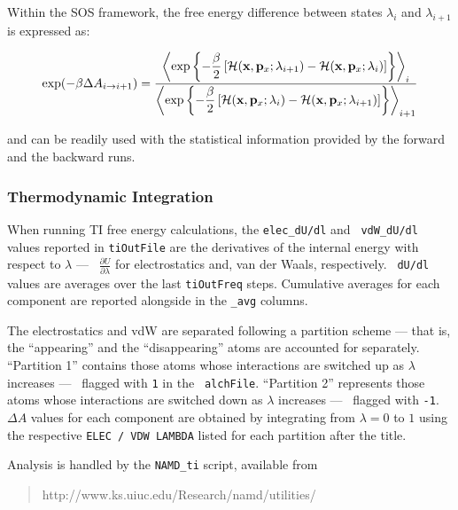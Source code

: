 Within the SOS framework, the free energy difference between states $\lambda_i$ and
$\lambda_{i+1}$ is expressed as:


\begin{equation}
\exp(-\beta \Delta A_{i \rightarrow i+1})  =
\frac{\displaystyle
      \left\langle \exp\left\{-\frac{\beta}{2}
                       \left[
                       {\cal H}({\bf x}, {\bf p}_x; \lambda_{i+1}) - {\cal H}({\bf x}, {\bf p}_x; \lambda_i)
                       \right]
                       \right\}
      \right\rangle_i}
      {\displaystyle
       \left\langle \exp\left\{-\frac{\beta}{2}
                       \left[
                       {\cal H}({\bf x}, {\bf p}_x; \lambda_i) - {\cal H}({\bf x}, {\bf p}_x; \lambda_{i+1})
                       \right]
                       \right\}
      \right\rangle_{i+1}}
\label{sos}
\end{equation}

\noindent and can be readily used with the statistical information provided by the forward and the backward runs.


\subsubsection{Thermodynamic Integration }


When running TI free energy calculations, the {\tt elec\_dU/dl} and {\tt
vdW\_dU/dl} values reported in {\tt tiOutFile} are the derivatives of the
internal energy with respect to $\lambda$ --- \ie~$\frac{\partial
U}{\partial\lambda}$ for electrostatics and, van der Waals, respectively. {\tt
dU/dl} values are averages over the last {\tt tiOutFreq} steps. Cumulative
averages for each component are reported alongside in the {\tt \_avg} columns.


The electrostatics and vdW are separated following a partition scheme --- that
is, the ``appearing'' and the ``disappearing'' atoms are accounted for
separately. ``Partition 1'' contains those atoms whose interactions are
switched up as $\lambda$ increases --- \ie~flagged with {\tt 1} in the {\tt
alchFile}. ``Partition 2'' represents those atoms whose interactions are
switched down as $\lambda$ increases --- \ie~flagged with {\tt -1}. $\Delta A$
values for each component are obtained by integrating from $\lambda=0$ to $1$
using the respective {\tt ELEC / VDW LAMBDA} listed for each partition after
the title.


Analysis is handled by the {\tt NAMD\_ti} script, available from
\begin{quote}
http://www.ks.uiuc.edu/Research/namd/utilities/
\end{quote}


